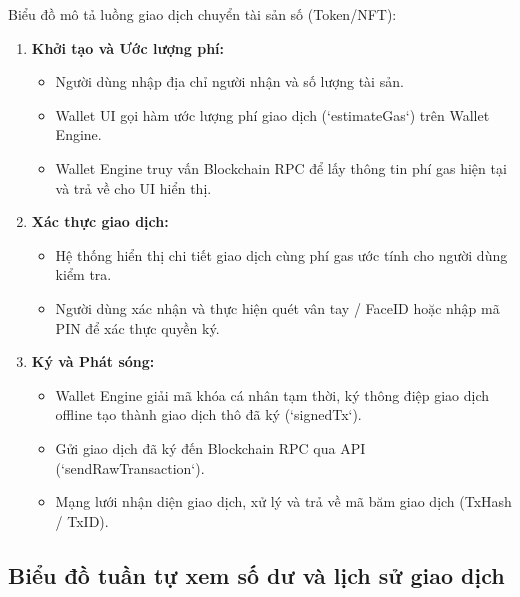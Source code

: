 \documentclass[a4paper]{report}
\begin{document}
Biểu đồ mô tả luồng giao dịch chuyển tài sản số (Token/NFT):
\begin{enumerate}
    \item \textbf{Khởi tạo và Ước lượng phí:}
    \begin{itemize}
        \item Người dùng nhập địa chỉ người nhận và số lượng tài sản.
        \item Wallet UI gọi hàm ước lượng phí giao dịch (`estimateGas`) trên Wallet Engine.
        \item Wallet Engine truy vấn Blockchain RPC để lấy thông tin phí gas hiện tại và trả về cho UI hiển thị.
    \end{itemize}
    \item \textbf{Xác thực giao dịch:}
    \begin{itemize}
        \item Hệ thống hiển thị chi tiết giao dịch cùng phí gas ước tính cho người dùng kiểm tra.
        \item Người dùng xác nhận và thực hiện quét vân tay / FaceID hoặc nhập mã PIN để xác thực quyền ký.
    \end{itemize}
    \item \textbf{Ký và Phát sóng:}
    \begin{itemize}
        \item Wallet Engine giải mã khóa cá nhân tạm thời, ký thông điệp giao dịch offline tạo thành giao dịch thô đã ký (`signedTx`).
        \item Gửi giao dịch đã ký đến Blockchain RPC qua API (`sendRawTransaction`).
        \item Mạng lưới nhận diện giao dịch, xử lý và trả về mã băm giao dịch (TxHash / TxID).
    \end{itemize}
\end{enumerate}

\subsection{Biểu đồ tuần tự xem số dư và lịch sử giao dịch}
\end{document}
